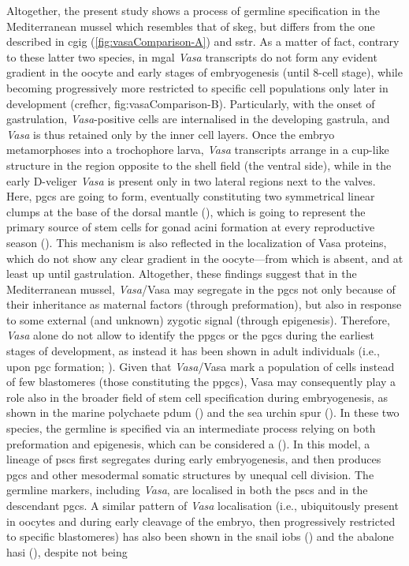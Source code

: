 Altogether, the present study shows a process of germline specification in the Mediterranean mussel which resembles that of \gls{skeg}, but differs from the one described in \gls{cgig} (\cref{fig:vasaComparison-A}) and \gls{sstr}. As a matter of fact, contrary to these latter two species, in \gls{mgal} \textit{Vasa} transcripts do not form any evident gradient in the oocyte and early stages of embryogenesis (until 8-cell stage), while becoming progressively more restricted to specific cell populations only later in development (cref{hcr, fig:vasaComparison-B}). Particularly, with the onset of gastrulation, \textit{Vasa}-positive cells are internalised in the developing gastrula, and \textit{Vasa} is thus retained only by the inner cell layers. Once the embryo metamorphoses into a trochophore larva, \textit{Vasa} transcripts arrange in a cup-like structure in the region opposite to the shell field (the ventral side), while in the early D-veliger \textit{Vasa} is present only in two lateral regions next to the valves. Here, \glspl{pgc} are going to form, eventually constituting two symmetrical linear clumps at the base of the dorsal mantle (), which is going to represent the primary source of stem cells for gonad acini formation at every reproductive season (). This mechanism is also reflected in the localization of Vasa proteins, which do not show any clear gradient in the oocyte---from which is absent, and at least up until gastrulation. Altogether, these findings suggest that in the Mediterranean mussel, \textit{Vasa}/Vasa may segregate in the \glspl{pgc} not only because of their inheritance as maternal factors (through preformation), but also in response to some external (and unknown) zygotic signal (through epigenesis). Therefore, \textit{Vasa} alone do not allow to identify the \glspl{ppgc} or the \glspl{pgc} during the earliest stages of development, as instead it has been shown in adult individuals (i.e., upon \gls{pgc} formation; ). Given that \textit{Vasa}/Vasa mark a population of cells instead of few blastomeres (those constituting the \glspl{ppgc}), Vasa may consequently play a role also in the broader field of stem cell specification during embryogenesis, as shown in the marine polychaete \gls{pdum} () and the sea urchin \gls{spur} (). In these two species, the germline is specified via an intermediate process relying on both preformation and epigenesis, which can be considered a  (). In this model, a lineage of \glspl{psc} first segregates during early embryogenesis, and then produces \glspl{pgc} and other mesodermal somatic structures by unequal cell division. The germline markers, including \textit{Vasa}, are localised in both the \glspl{psc} and in the descendant \glspl{pgc}. A similar pattern of \textit{Vasa} localisation (i.e., ubiquitously present in oocytes and during early cleavage of the embryo, then progressively restricted to specific blastomeres) has also been shown in the snail \gls{iobs} () and the abalone \gls{hasi} (), despite not being 